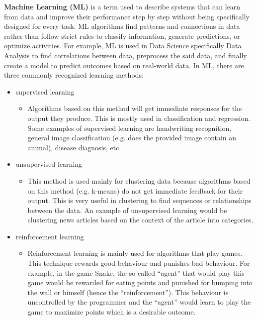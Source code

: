 \textbf{Machine Learning (ML)} is a term used to describe systems that can learn from data and improve their performance step by step without being specifically designed for every task. ML algorithms find patterns and connections in data rather than follow strict rules to classify information, generate predictions, or optimize activities. For example, ML is used in Data Science specifically Data Analysis to find correlations between data, preprocess the said data, and finally create a model to predict outcomes based on real-world data. In ML, there are three commonly recognized learning methods:
\begin{itemize}
    \item supervised learning
        \begin{itemize}
            \item Algorithms based on this method will get immediate responses for the output they produce. This is mostly used in classification and regression. Some examples of supervised learning are handwriting recognition, general image classification (e.g. does the provided image contain an animal), disease diagnosis, etc.
        \end{itemize}
    \item unsupervised learning
        \begin{itemize}
                \item This method is used mainly for clustering data because algorithms based on this method (e.g. k-means) do not get immediate feedback for their output. This is very useful in clustering to find sequences or relationships between the data. An example of unsupervised learning would be clustering news articles based on the context of the article into categories.
            \end{itemize}
    \item reinforcement learning
        \begin{itemize}
            \item Reinforcement learning is mainly used for algorithms that play games. This technique rewards good behaviour and punishes bad behaviour. For example, in the game Snake, the so-called ``agent'' that would play this game would be rewarded for eating points and punished for bumping into the wall or himself (hence the ``reinforcement''). This behaviour is uncontrolled by the programmer and the ``agent'' would learn to play the game to maximize points which is a desirable outcome.
        \end{itemize}
\end{itemize}


